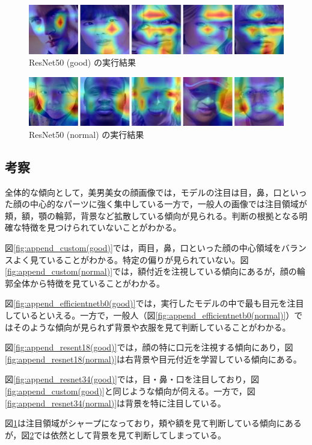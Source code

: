 \documentclass[a4paper,11pt,titlepage]{jsarticle}
\begin{document}
\begin{figure}[H]
    \centering
    \includegraphics[width=1.1\textwidth]{resnet50(good).jpg}
    \caption{ResNet50 (good) の実行結果}
    \label{fig:append_resnet50(good)}
\end{figure}

\begin{figure}[H]
    \centering
    \includegraphics[width=1.1\textwidth]{resnet50(normal).jpg}
    \caption{ResNet50 (normal) の実行結果}
    \label{fig:append_resnet50(normal)}
\end{figure}


\subsection{考察}
全体的な傾向として，美男美女の顔画像では，モデルの注目は目，鼻，口といった顔の中心的なパーツに強く集中している一方で，一般人の画像では注目領域が頬，額，顎の輪郭，背景など拡散している傾向が見られる。判断の根拠となる明確な特徴を見つけられていないことがわかる。


図\ref{fig:append_custom(good)}では，両目，鼻，口といった顔の中心領域をバランスよく見ていることがわかる。特定の偏りが見られていない。図\ref{fig:append_custom(normal)}では，額付近を注視している傾向にあるが，顔の輪郭全体から特徴を見ていることがわかる。\par
図\ref{fig:append_efficientnetb0(good)}では，実行したモデルの中で最も目元を注目しているといえる。一方で，一般人（図\ref{fig:append_efficientnetb0(normal)}）ではそのような傾向が見られず背景や衣服を見て判断していることがわかる。\par

図\ref{fig:append_resent18(good)}では，顔の特に口元を注視する傾向にあり，図\ref{fig:append_resnet18(normal)}は右背景や目元付近を学習している傾向にある。\par
図\ref{fig:append_resnet34(good)}では，目・鼻・口を注目しており，図\ref{fig:append_custom(good)}と同じような傾向が伺える。一方で，図\ref{fig:append_resnet34(normal)}は背景を特に注目している。\par

図\ref{fig:append_resnet50(good)}は注目領域がシャープになっており，頬や額を見て判断している傾向にあるが，図\ref{fig:append_resnet50(normal)}では依然として背景を見て判断してしまっている。
\end{document}
